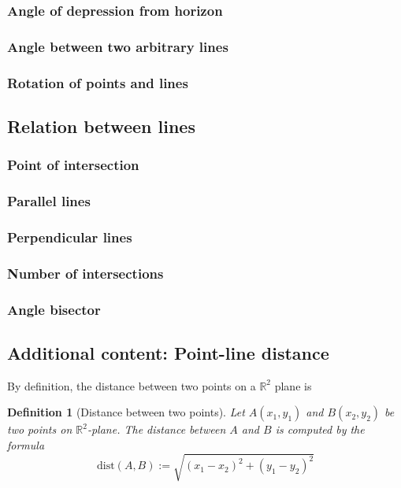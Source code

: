 \documentclass[12pt]{article}
\newtheorem{definition}{Definition}[section]
\begin{document}
    \subsubsection{Angle of depression from horizon}

    \subsubsection{Angle between two arbitrary lines}

    \subsubsection{Rotation of points and lines}

    \subsection{Relation between lines}

    \subsubsection{Point of intersection}

    \subsubsection{Parallel lines}

    \subsubsection{Perpendicular lines}

    \subsubsection{Number of intersections}

    \subsubsection{Angle bisector}

    \subsection{Additional content: Point-line distance}

    By definition, the distance between two points on a $\mathbb{R}^2$ plane is 

    \begin{definition}[Distance between two points]
        Let $A(x_1,y_1)$ and $B(x_2,y_2)$ be two points on $\mathbb{R}^2$-plane. The distance between $A$ and $B$ is computed by the formula $$\mathrm{dist}(A,B):=\sqrt{(x_1-x_2)^2+(y_1-y_2)^2}$$
    \end{definition}
\end{document}
